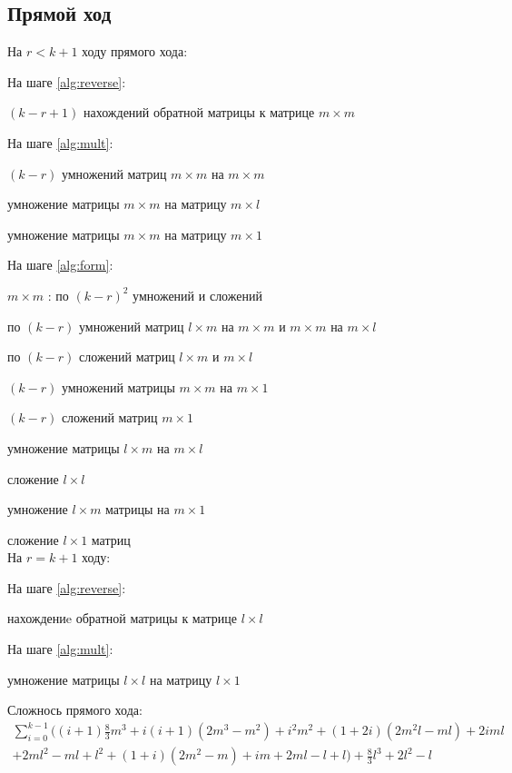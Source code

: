 \documentclass[12pt]{article}
\begin{document}
		\subsection{Прямой ход}
		
		На $r < k + 1$ ходу прямого хода:

		На шаге \ref{alg:reverse}: \par
			\quad $(k - r + 1)$ нахождений обратной матрицы к матрице $m \times m$
		
		На шаге \ref{alg:mult}: \par
			\quad $(k - r)$ умножений матриц $m \times m$ на $m \times m$  \par
			 умножение матрицы $m \times m$ на матрицу $m \times l$ \par
			 умножение матрицы $m \times m$ на матрицу $m \times 1$

		На шаге \ref{alg:form}: \par
			\quad $m \times m$ : по $(k - r)^2$ умножений и сложений		\par
			\quad по $(k - r)$ умножений матриц $l \times m$ на $m \times m$
				  							и $m \times m$ на $m \times l$	\par
			\quad по $(k - r)$ сложений матриц $l \times m$ и $m \times l$ 	\par
			\quad $(k - r)$ умножений матрицы $m \times m$ на $m \times 1$	\par
			\quad $(k - r)$ сложений матриц $m \times 1$					\par
			 умножение матрицы $l \times m$ на $m \times l$			\par
			 сложение $l \times l$									\par
			 умножение $l \times m$ матрицы на $m \times 1$			\par
			 сложение $l \times 1$ матриц 							\\
		На $r = k + 1$ ходу:	

		На шаге \ref{alg:reverse}: \par
			 нахождениe обратной матрицы к матрице $l \times l$
		
		На шаге \ref{alg:mult}: \par
			 умножение матрицы $l \times l$ на матрицу $l \times 1$

			Сложнось прямого хода:
		\begin{multline*}
			\sum_{i=0}^{k-1} ((i + 1) \frac{8}{3}m^3 + i(i + 1) (2m^3 - m^2) + i^2m^2 + (1+2i)(2m^2l-ml) + 2iml \\ + 2ml^2 - ml + l^2 + (1 + i)(2m^2-m) + im + 2ml - l + l) + \frac{8}{3}l^3+2l^2-l
		\end{multline*}
\end{document}
